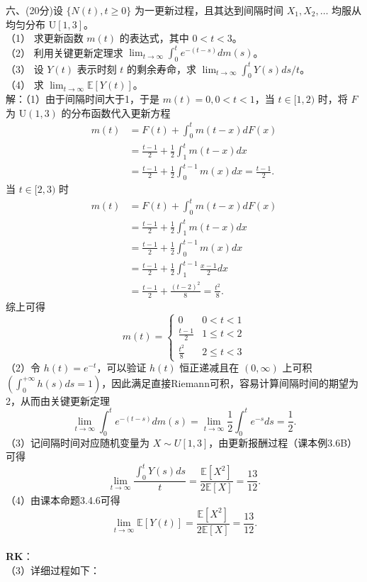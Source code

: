 \documentclass[UTF8,openany]{book}
\begin{document}
\noindent 六、(20分)设 $\{N(t), t \geq 0\}$ 为一更新过程，且其达到间隔时间 $X_1, X_2, \ldots$ 均服从均匀分布 $\mathrm{U}[1, 3]$。\\
（1） 求更新函数 $m(t)$ 的表达式，其中 $0 < t < 3$。\\
（2） 利用关键更新定理求 $\lim_{t \to \infty} \int_0^t e^{-(t-s)} dm(s)$。\\
（3） 设 $Y(t)$ 表示时刻 $t$ 的剩余寿命，求 $\lim_{t \to \infty} \int_0^t Y(s) ds/t$。\\
（4） 求 $\lim_{t \to \infty} \mathbb{E}[Y(t)]$。\\
解：（1）由于间隔时间大于1，于是 $m(t)=0,0<t<1$，当 $t\in[1,2)$ 时，将 $F$ 为 $\mathrm{U}(1,3)$ 的分布函数代入更新方程
$$
\begin{aligned}
	m(t)&=F(t)+\int_{0}^tm(t-x)dF(x)\\
	&=\frac{t-1}{2}+\frac{1}{2}\int_{1}^tm(t-x)dx\\
	&=\frac{t-1}{2}+\frac{1}{2}\int_{0}^{t-1}m(x)dx=\frac{t-1}{2}.
\end{aligned}
$$
当 $t\in[2,3)$ 时
$$
\begin{aligned}
	m(t)&=F(t)+\int_{0}^tm(t-x)dF(x)\\
	&=\frac{t-1}{2}+\frac{1}{2}\int_{1}^tm(t-x)dx\\
	&=\frac{t-1}{2}+\frac{1}{2}\int_{0}^{t-1}m(x)dx\\
	&=\frac{t-1}{2}+\frac{1}{2}\int_{1}^{t-1}\frac{x-1}{2}dx\\
	&=\frac{t-1}{2}+\frac{(t-2)^2}{8}=\frac{t^2}{8}.
\end{aligned}
$$
综上可得
$$
m(t)=
\begin{cases}
	0  &  0<t<1 \\
	\frac{t-1}{2}  &  1\leq t<2\\
	\frac{t^2}{8}  &	2\leq t<3
\end{cases}
$$
（2）令 $h(t)=e^{-t}$，可以验证 $h(t)$ 恒正递减且在 $(0,\infty)$ 上可积$\left( \int_{0}^{+\infty} h(s)ds=1 \right) $，因此满足直接Riemann可积，容易计算间隔时间的期望为2，从而由关键更新定理
$$
\lim_{t\to \infty}\int_{0}^t e^{-(t-s)}dm(s)=\lim_{t\to \infty}\frac{1}{2}\int_{0}^t e^{-s}ds=\frac{1}{2}.$$
（3）记间隔时间对应随机变量为 $X\sim U[1,3]$，由更新报酬过程（课本例3.6B）可得
$$
\lim_{t\to \infty}\frac{\int_{0}^t Y(s)ds}{t}=\frac{\mathbb{E}[X^2]}{2\mathbb{E}[X]}=\frac{13}{12}.
$$
（4）由课本命题3.4.6可得
$$
\lim_{t\to \infty}\mathbb{E}[Y(t)]=\frac{\mathbb{E}[X^2]}{2\mathbb{E}[X]}=\frac{13}{12}.
$$\\
\textbf{RK}：\\
（3）详细过程如下：\\
\end{document}
